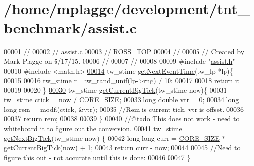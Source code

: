 \hypertarget{assist_8c_source}{}\section{/home/mplagge/development/tnt\+\_\+benchmark/assist.c}

\begin{DoxyCode}
00001 \textcolor{comment}{//}
00002 \textcolor{comment}{//  assist.c}
00003 \textcolor{comment}{//  ROSS\_TOP}
00004 \textcolor{comment}{//}
00005 \textcolor{comment}{//  Created by Mark Plagge on 6/17/15.}
00006 \textcolor{comment}{//}
00007 \textcolor{comment}{//}
00008 
00009 \textcolor{preprocessor}{#include "\hyperlink{assist_8h}{assist.h}"}
00010 \textcolor{preprocessor}{    #include <math.h>}
\hypertarget{assist_8c_source_l00014}{}\hyperlink{assist_8h_a30602b11dbfa6bcb90dc00e7942cfb02}{00014} tw\_stime \hyperlink{assist_8c_a30602b11dbfa6bcb90dc00e7942cfb02}{getNextEventTime}(tw\_lp *lp)\{
00015 
00016     tw\_stime r =tw\_rand\_unif(lp->rng) / 10;
00017 
00018     \textcolor{keywordflow}{return} r;
00019 
00020 \}
\hypertarget{assist_8c_source_l00030}{}\hyperlink{assist_8h_a4d378196b7fceed090d64ec8820b4065}{00030} tw\_stime \hyperlink{assist_8c_a4d378196b7fceed090d64ec8820b4065}{getCurrentBigTick}(tw\_stime now)\{
00031     tw\_stime ctick = now / \hyperlink{assist_8h_ad39b86a0b748731175572436f6672264}{CORE\_SIZE};
00033     \textcolor{keywordtype}{long} \textcolor{keywordtype}{double} vtr = 0;
00034     \textcolor{keywordtype}{long} \textcolor{keywordtype}{long} rem = modfl(ctick, &vtr);
00035     \textcolor{comment}{//Rem is current tick, vtr is offset.}
00036 
00037     \textcolor{keywordflow}{return} rem;
00038 
00039 \}
00040     \textcolor{comment}{//@todo This does not work - need to whiteboard it to figure out the conversion.}
\hypertarget{assist_8c_source_l00041}{}\hyperlink{assist_8h_aa961bc9b414f1429b123fc8212c989fd}{00041} tw\_stime \hyperlink{assist_8c_aa961bc9b414f1429b123fc8212c989fd}{getNextBigTick}(tw\_stime now) \{
00042     \textcolor{keywordtype}{long} \textcolor{keywordtype}{long} curr = \hyperlink{assist_8h_ad39b86a0b748731175572436f6672264}{CORE\_SIZE} * \hyperlink{assist_8c_a4d378196b7fceed090d64ec8820b4065}{getCurrentBigTick}(now) + 1;
00043     \textcolor{keywordflow}{return} curr - now;
00044 
00045         \textcolor{comment}{//Need to figure this out - not accurate until this is done:}
00046 
00047 \}
\end{DoxyCode}
